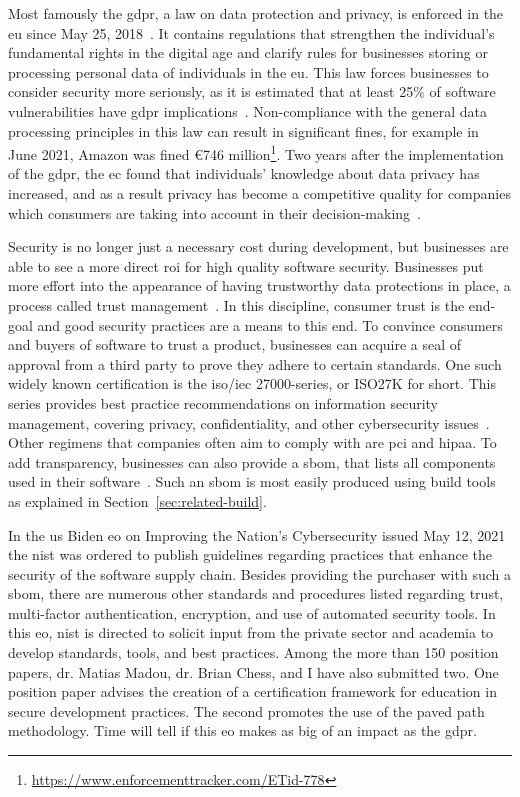Most famously the \gls{gdpr}, a law on data protection and privacy, is enforced in the \gls{eu} since May 25, 2018~\cite{gdpr}.
It contains regulations that strengthen the individual's fundamental rights in the digital age and clarify rules for businesses storing or processing personal data of individuals in the \gls{eu}.
This law forces businesses to consider security more seriously, as it is estimated that at least 25\% of software vulnerabilities have \gls{gdpr} implications~\cite{gdprhackerone}.
Non-compliance with the general data processing principles in this law can result in significant fines, for example in June 2021, Amazon was fined €746 million\footnote{\url{https://www.enforcementtracker.com/ETid-778}}.
Two years after the implementation of the \gls{gdpr}, the \gls{ec} found that individuals' knowledge about data privacy has increased, and as a result privacy has become a competitive quality for companies which consumers are taking into account in their decision-making~\cite{gdprfra}.

Security is no longer just a necessary cost during development, but businesses are able to see a more direct \gls{roi} for high quality software security.
Businesses put more effort into the appearance of having trustworthy data protections in place, a process called trust management~\cite{cassandra2021analysis, ashraf2020role}.
In this discipline, consumer trust is the end-goal and good security practices are a means to this end.
To convince consumers and buyers of software to trust a product, businesses can acquire a seal of approval from a third party to prove they adhere to certain standards.
One such widely known certification is the \gls{iso}/\gls{iec} 27000-series, or ISO27K for short.
This series provides best practice recommendations on information security management, covering privacy, confidentiality, and other cybersecurity issues~\cite{iso27k}.
Other regimens that companies often aim to comply with are \gls{pci} and \gls{hipaa}.
To add transparency, businesses can also provide a \gls{sbom}, that lists all components used in their software~\cite{sbomntia}.
Such an \gls{sbom} is most easily produced using build tools as explained in Section~\ref{sec:related-build}.

In the \gls{us} Biden \gls{eo} on Improving the Nation's Cybersecurity issued May 12, 2021 the \gls{nist} was ordered to publish guidelines regarding practices that enhance the security of the software supply chain.
Besides providing the purchaser with such a \gls{sbom}, there are numerous other standards and procedures listed regarding trust, multi-factor authentication, encryption, and use of automated security tools.
In this \gls{eo}, \gls{nist} is directed to solicit input from the private sector and academia to develop standards, tools, and best practices.
Among the more than 150 position papers, dr. Matias Madou, dr. Brian Chess, and I have also submitted two.
One position paper advises the creation of a certification framework for education in secure development practices.
The second promotes the use of the paved path methodology.
Time will tell if this \gls{eo} makes as big of an impact as the \gls{gdpr}.

